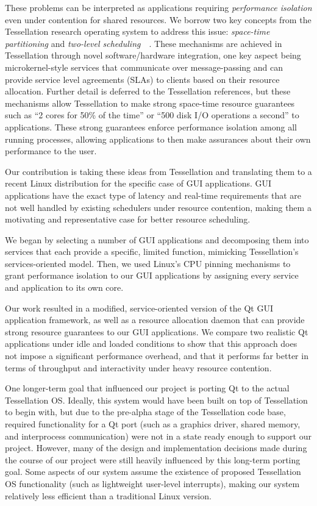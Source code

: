 \documentclass[letterpaper,twocolumn,11pt]{article}
\begin{document}
These problems can be interpreted as applications requiring \emph{performance isolation} even under contention for shared resources. We borrow two key concepts from the Tessellation research operating system to address this issue: \emph{space-time partitioning} and \emph{two-level scheduling}~\cite{liu09tessellation}~\cite{tessellation-hotpar10}. These mechanisms are achieved in Tessellation through novel software/hardware integration, one key aspect being microkernel-style services that communicate over message-passing and can provide service level agreements (SLAs) to clients based on their resource allocation. Further detail is deferred to the Tessellation references, but these mechanisms allow Tessellation to make strong space-time resource guarantees such as ``2 cores for 50\% of the time'' or ``500 disk I/O operations a second'' to applications. These strong guarantees enforce performance isolation among all running processes, allowing applications to then make assurances about their own performance to the user.

Our contribution is taking these ideas from Tessellation and translating them to a recent Linux distribution for the specific case of GUI applications. GUI applications have the exact type of latency and real-time requirements that are not well handled by existing schedulers under resource contention, making them a motivating and representative case for better resource scheduling.

We began by selecting a number of GUI applications and decomposing them into services that each provide a specific, limited function, mimicking Tessellation's services-oriented model. Then, we used Linux's CPU pinning mechanisms to grant performance isolation to our GUI applications by assigning every service and application to its own core.

Our work resulted in a modified, service-oriented version of the Qt GUI application framework, as well as a resource allocation daemon that can provide strong resource guarantees to our GUI applications. We compare two realistic Qt applications under idle and loaded conditions to show that this approach does not impose a significant performance overhead, and that it performs far better in terms of throughput and interactivity under heavy resource contention.

One longer-term goal that influenced our project is porting Qt to the actual Tessellation OS. Ideally, this system would have been built on top of Tessellation to begin with, but due to the pre-alpha stage of the Tessellation code base, required functionality for a Qt port (such as a graphics driver, shared memory, and interprocess communication) were not in a state ready enough to support our project. However, many of the design and implementation decisions made during the course of our project were still heavily influenced by this long-term porting goal. Some aspects of our system assume the existence of proposed Tessellation OS functionality (such as lightweight user-level interrupts), making our system relatively less efficient than a traditional Linux version.
\end{document}
